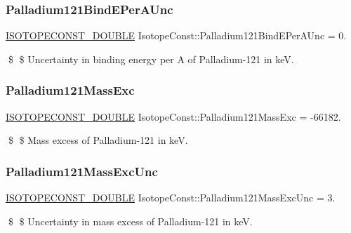 \subsubsection{\texorpdfstring{Palladium121\+Bind\+E\+Per\+A\+Unc}{Palladium121BindEPerAUnc}}
{\footnotesize\ttfamily \mbox{\hyperlink{group___isotope_const-_macros_ga8f45a7272ce02c0b4c65c44636ed719a}{I\+S\+O\+T\+O\+P\+E\+C\+O\+N\+S\+T\+\_\+\+D\+O\+U\+B\+LE}} Isotope\+Const\+::\+Palladium121\+Bind\+E\+Per\+A\+Unc = 0.}

\$ \$ Uncertainty in binding energy per A of Palladium-\/121 in keV. \mbox{\label{group___isotope_const-_palladium-_pd121_gaf67221c3238d8a035995653e6b0c60e4}} 
\subsubsection{\texorpdfstring{Palladium121\+Mass\+Exc}{Palladium121MassExc}}
{\footnotesize\ttfamily \mbox{\hyperlink{group___isotope_const-_macros_ga8f45a7272ce02c0b4c65c44636ed719a}{I\+S\+O\+T\+O\+P\+E\+C\+O\+N\+S\+T\+\_\+\+D\+O\+U\+B\+LE}} Isotope\+Const\+::\+Palladium121\+Mass\+Exc = -\/66182.}

\$ \$ Mass excess of Palladium-\/121 in keV. \mbox{\label{group___isotope_const-_palladium-_pd121_ga33d40471b78c89d9fb261c365e63b868}} 
\subsubsection{\texorpdfstring{Palladium121\+Mass\+Exc\+Unc}{Palladium121MassExcUnc}}
{\footnotesize\ttfamily \mbox{\hyperlink{group___isotope_const-_macros_ga8f45a7272ce02c0b4c65c44636ed719a}{I\+S\+O\+T\+O\+P\+E\+C\+O\+N\+S\+T\+\_\+\+D\+O\+U\+B\+LE}} Isotope\+Const\+::\+Palladium121\+Mass\+Exc\+Unc = 3.}

\$ \$ Uncertainty in mass excess of Palladium-\/121 in keV. \mbox{\label{group___isotope_const-_palladium-_pd121_ga894455fa254a620261aba6c8938cf1dd}} 
